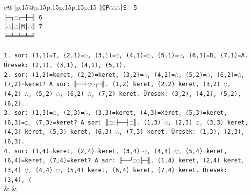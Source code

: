 \documentclass{article}
\begin{document}
{\begin{supertabular}{c@{$\;$}|p{.15\linewidth}@{}p{.15\linewidth}p{.15\linewidth}p{.15\linewidth}p{.15\linewidth}p{.15\linewidth}}
{{{\texttt{║OP◌◌◌│S║ 5} \\
\texttt{╟─┐◌┌─┼─╢ 6} \\
\texttt{║◌│◌│M│◌║ 7} \\
\texttt{╚═╧═╧═╧═╝} \\
\\ 
\texttt{1. sor: (1,1)=T, (2,1)=◌, (3,1)=◌, (4,1)=◌, (5,1)=◌, (6,1)=D, (7,1)=A. Üresek: (2,1), (3,1), (4,1), (5,1).} \\
\texttt{2. sor: (1,2)=keret, (2,2)=keret, (3,2)=◌, (4,2)=◌, (5,2)=◌, (6,2)=◌, (7,2)=keret? A sor: ╟──┤◌◌┌─╢. (1,2) keret, (2,2) keret, (3,2) ◌, (4,2) ◌, (5,2) ◌, (6,2) ◌, (7,2) keret. Üresek: (3,2), (4,2), (5,2), (6,2).} \\
\texttt{3. sor: (1,3)=◌, (2,3)=◌, (3,3)=keret, (4,3)=keret, (5,3)=keret, (6,3)=◌, (7,3)=keret? A sor: ║◌◌├──┤◌║. (1,3) ◌, (2,3) ◌, (3,3) keret, (4,3) keret, (5,3) keret, (6,3) ◌, (7,3) keret. Üresek: (1,3), (2,3), (6,3).} \\
\texttt{4. sor: (1,4)=keret, (2,4)=keret, (3,4)=◌, (4,4)=◌, (5,4)=keret, (6,4)=keret, (7,4)=keret? A sor: ╟──┘◌◌├─╢. (1,4) keret, (2,4) keret, (3,4) ◌, (4,4) ◌, (5,4) keret, (6,4) keret, (7,4) keret. Üresek: (3,4), (} \\
            }
        }
    }
    & & \\ \\


\end{supertabular}}
\end{document}
